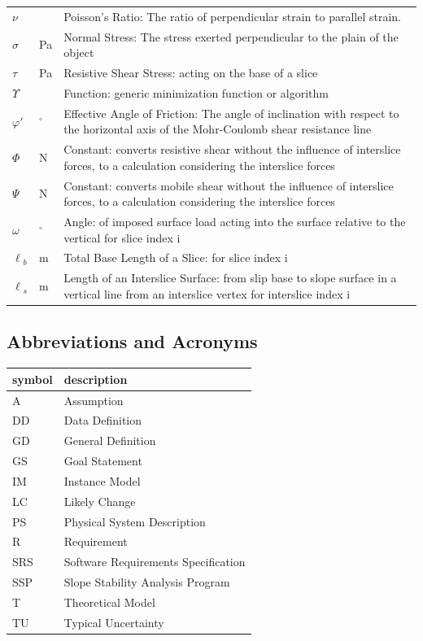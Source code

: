 \documentclass[12pt]{article}
\newcommand{\progname}{SSP}
\renewcommand{\arraystretch}{1}
\begin{document}
\begin{longtable}{  l  l  p{8.5cm}  }
\\
$\nu{}$ & & Poisson's Ratio: The ratio of perpendicular strain to parallel strain. 
\\
$\sigma{}$ & \si{\pascal} &Normal Stress: The stress exerted perpendicular to the plain of the object
\\
$\tau{}$ & \si{\pascal} & Resistive Shear Stress: acting on the base of a slice
\\
$\Upsilon{}$ & & Function: generic minimization function or algorithm 
\\
$\varphi{}'$ & ${}^{\circ}$ &Effective Angle of Friction: The angle of inclination with respect to the horizontal axis of the Mohr-Coulomb shear resistance line
\\
$\Phi{}$ & \si{\newton} & Constant: converts resistive shear without the influence of interslice forces, to a calculation considering the interslice forces
\\
$\Psi{}$ & \si{\newton} & Constant: converts mobile shear without the influence of interslice forces, to a calculation considering the interslice forces
\\
$\omega{}$ & ${}^{\circ}$ & Angle: of imposed surface load acting into the surface relative to the vertical for slice index i
\\
${\ell{}_{b}}$ &  \si{\meter}& Total Base Length of a Slice: for slice index i
\\
${\ell{}_{s}}$ &  \si{\meter}& Length of an Interslice Surface: from slip base to slope surface in a vertical line from an interslice vertex for interslice index i \\

\hline
\end{longtable}
\renewcommand{\arraystretch}{1}


\subsection{Abbreviations and Acronyms}

\renewcommand{\arraystretch}{1.2}
\begin{tabular}{l l} 
  \toprule		
  \textbf{symbol} & \textbf{description}\\
  \midrule 
  A & Assumption\\
  DD & Data Definition\\
  GD & General Definition\\
  GS & Goal Statement\\
  IM & Instance Model\\
  LC & Likely Change\\
  PS & Physical System Description\\
  R & Requirement\\
  SRS & Software Requirements Specification\\
  \progname\ & Slope Stability Analysis Program\\
  T & Theoretical Model\\
TU & Typical Uncertainty
\\
  \bottomrule
\end{tabular}\\
\end{document}
